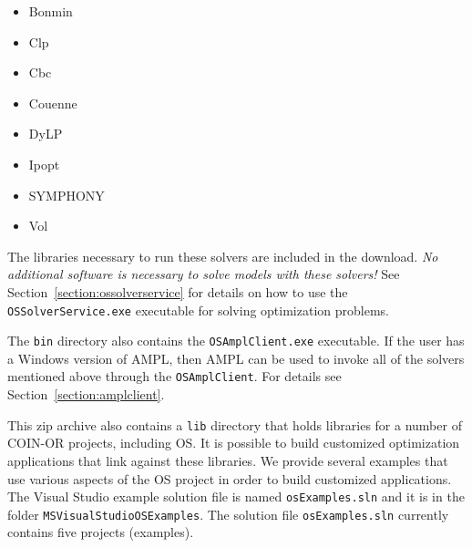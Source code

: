 \documentclass[11pt]{article}
\renewcommand{\_}{{\char"5F}}
\renewcommand{\{}{{\char"7B}}
\renewcommand{\}}{{\char"7D}}
\renewcommand{\^}{{\char"0D}}
\renewcommand{\'}{{\char"0D}}
\begin{document}
\begin{itemize}

\item Bonmin

\item Clp

\item Cbc

\item Couenne

\item DyLP

\item Ipopt

\item SYMPHONY

\item Vol

\end{itemize}
The libraries necessary to run these solvers are included in the download.  {\it No additional software is necessary
to solve models with these solvers!}   See Section~\ref{section:ossolverservice} for details on how to use the
{\tt OSSolverService.exe} executable for solving optimization problems.


The {\tt bin} directory also contains the {\tt OSAmplClient.exe} executable. If the user has a Windows version of AMPL,
then AMPL can be used to invoke all of the solvers mentioned above through the {\tt OSAmplClient}.  For details
see Section~\ref{section:amplclient}.



This zip archive also contains a  {\tt lib} directory that holds  libraries for a number of COIN-OR projects, including OS.
It is possible to build customized optimization applications that link against these libraries. We provide several examples
that use various aspects of the OS project in order to build customized applications.
The Visual Studio example solution file is named {\tt osExamples.sln} and it is in the folder {\tt MSVisualStudioOSExamples}.
The solution file {\tt osExamples.sln}  currently contains five projects (examples).
\end{document}
